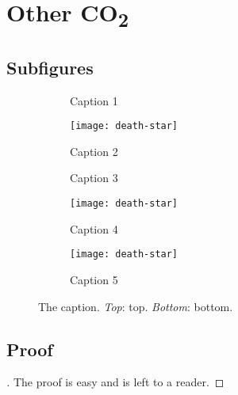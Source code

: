 \documentclass[a4paper,11pt]{article}
\begin{document}
  \section{Other CO\texorpdfstring{\textsubscript{2}}{2}}
  \subsection*{Subfigures}

  \begin{figure}[htb]
    \centering
    \begin{subfigure}[b]{.475\textwidth}
      \caption{Caption 1}  %
      \label{fig:1}
    \end{subfigure}
    \hfill
    \begin{subfigure}[b]{.475\textwidth}
      \texttt{[image: death-star]}
      \caption{Caption 2}
      \label{fig:2}
    \end{subfigure}
    \begin{subfigure}[b]{.3\textwidth}
      \caption{Caption 3}
      \label{fig:3}
    \end{subfigure}
    \hfill
    \begin{subfigure}[b]{.3\textwidth}
      \texttt{[image: death-star]}
      \caption{Caption 4}
      \label{fig:4}
    \end{subfigure}
    \hfill
    \begin{subfigure}[b]{.3\textwidth}
      \texttt{[image: death-star]}
      \caption{Caption 5}
      \label{fig:5}
    \end{subfigure}
    \caption{The caption. \emph{Top}: top. \emph{Bottom}: bottom.}
    \label{fig:subfigures}
  \end{figure}

  \subsection*{Proof}
    \begin{proof}[\unskip\nopunct]
      The proof is easy and is left to a reader.
    \end{proof}
\end{document}
